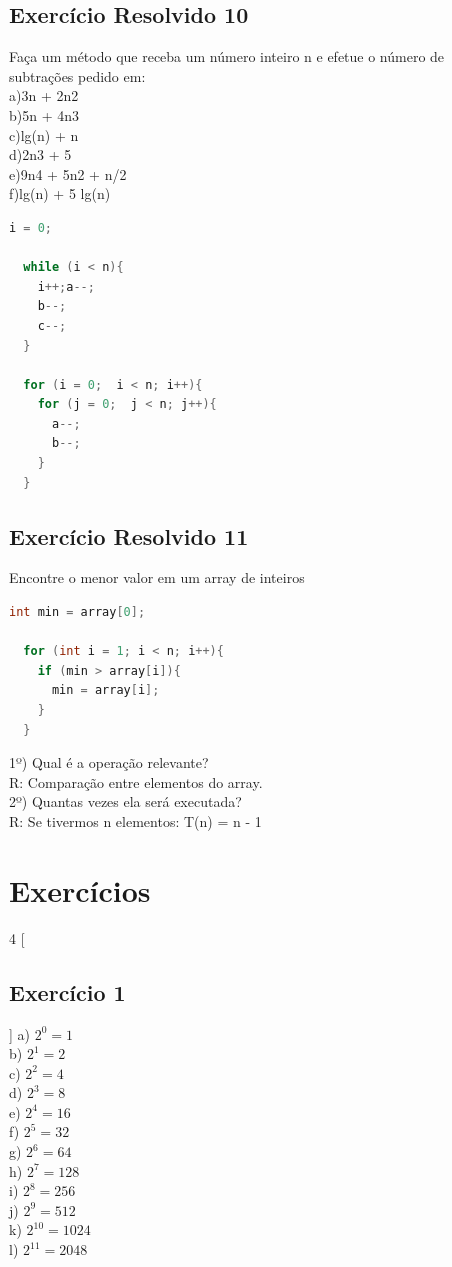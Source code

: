 \documentclass[12pt]{article}
\begin{document}
\subsection{Exercício Resolvido 10}
Faça um método que receba um número inteiro n e efetue o número de subtrações pedido em:\\
a)3n + 2n2\\
b)5n + 4n3\\
c)lg(n) + n\\
d)2n3 + 5\\
e)9n4 + 5n2 + n/2\\
f)lg(n) + 5 lg(n)
\begin{lstlisting}[language=C]
  i = 0;
  
  while (i < n){
    i++;a--;
    b--;
    c--;
  }
  
  for (i = 0;  i < n; i++){
    for (j = 0;  j < n; j++){
      a--;
      b--;
    }
  }
\end{lstlisting}

\subsection{Exercício Resolvido 11}
Encontre o menor valor em um array de inteiros
\begin{lstlisting}[language=C]
  int min = array[0];
  
  for (int i = 1; i < n; i++){
    if (min > array[i]){
      min = array[i];
    }
  }
\end{lstlisting}
1º) Qual é a operação relevante?\\
R: Comparação entre elementos do array.\\
2º) Quantas vezes ela será executada?\\
R: Se tivermos n elementos: T(n) = n - 1\\

\section{Exercícios}

\begin{multicols}{4}
  [
    \subsection{Exercício 1}
  ]
  a) $2^{0} = 1$ \\
  b) $2^{1} = 2$ \\
  c) $2^{2} = 4$ \\
  d) $2^{3} = 8$ \\
  e) $2^{4} = 16$ \\
  f) $2^{5} = 32$ \\
  g) $2^{6} = 64$ \\
  h) $2^{7} = 128$ \\
  i) $2^{8} = 256$ \\
  j) $2^{9} = 512$ \\
  k) $2^{10} = 1024$ \\
  l) $2^{11} = 2048$ \\
  \end{multicols}
\end{document}
